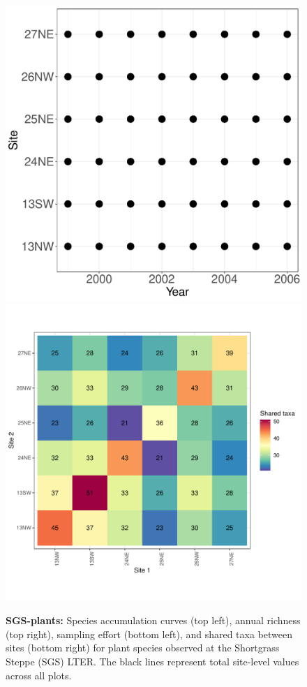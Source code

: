 \documentclass[11pt, oneside]{article}
\begin{document}
\begin{figure}[h!]
\includegraphics[scale = 0.4]{sgs-plants-catano_spatiotemporal_sampling_effort.pdf}
\includegraphics[scale = 0.4]{sgs-plants-catano_spp_shared.pdf}
\caption{{\bf SGS-plants:} Species accumulation curves (top left),  annual richness (top right), sampling effort (bottom left), and shared taxa between sites (bottom right) for plant species observed at the Shortgrass Steppe (SGS) LTER. The black lines represent total site-level values across all plots.}
\label{sgs-plants}
\end{figure}
\end{document}

